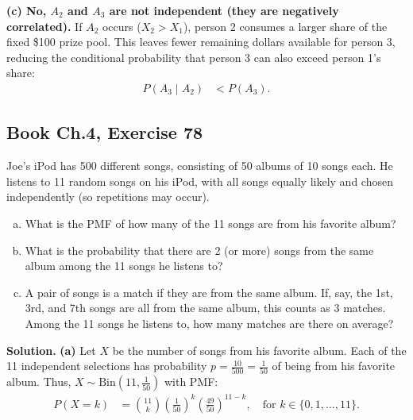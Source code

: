 \documentclass[11pt,a4paper]{article}
\begin{document}
\vspace{4pt}
\noindent \textbf{(c) No, $A_2$ and $A_3$ are not independent (they are negatively correlated).}
If $A_2$ occurs ($X_2 > X_1$), person 2 consumes a larger share of the fixed \$100 prize pool. This leaves fewer remaining dollars available for person 3, reducing the conditional probability that person 3 can also exceed person 1's share:
\begin{align*}
P(A_3 \mid A_2) &< P(A_3).
\end{align*}

\vspace{10pt}
\subsection{Book Ch.4, Exercise 78}
\begin{tcolorbox}[title={Book Ch.4, Exercise 78}]
Joe's iPod has 500 different songs, consisting of 50 albums of 10 songs each. He listens to 11 random songs on his iPod, with all songs equally likely and chosen independently (so repetitions may occur).
\begin{enumerate}[(a)]
\item What is the PMF of how many of the 11 songs are from his favorite album?
\item What is the probability that there are 2 (or more) songs from the same album among the 11 songs he listens to?
\item A pair of songs is a match if they are from the same album. If, say, the 1st, 3rd, and 7th songs are all from the same album, this counts as 3 matches. Among the 11 songs he listens to, how many matches are there on average?
\end{enumerate}
\end{tcolorbox}

\noindent \textbf{Solution.} \textbf{(a)} Let $X$ be the number of songs from his favorite album. Each of the 11 independent selections has probability $p = \frac{10}{500} = \frac{1}{50}$ of being from his favorite album. Thus, $X \sim \text{Bin}\left(11, \frac{1}{50}\right)$ with PMF:
\begin{align*}
P(X = k) &= \binom{11}{k} \left(\frac{1}{50}\right)^k \left(\frac{49}{50}\right)^{11 - k}, \quad \text{for } k \in \{0, 1, \dots, 11\}.
\end{align*}
\end{document}
